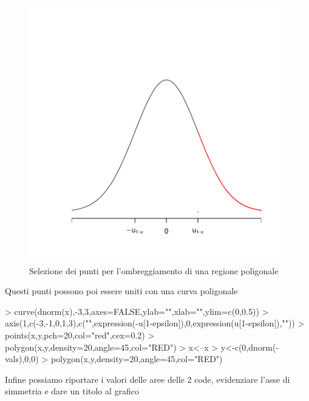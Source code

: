 \documentclass[onecolumn,11pt]{book}
\begin{document}
\begin{figure}\begin{center}
\includegraphics{statisticaconR-361}
\caption{ Selezione dei punti per l'ombreggiamento di una regione poligonale}
\label{normale200punti}
\end{center}
\end{figure}

Questi punti  possono poi essere uniti con una curva poligonale  
\begin{Schunk}
\begin{Sinput}
> curve(dnorm(x),-3,3,axes=FALSE,ylab="",xlab="",ylim=c(0,0.5))
> axis(1,c(-3,-1,0,1,3),c("",expression(-u[1-epsilon]),0,expression(u[1-epsilon]),""))
> points(x,y,pch=20,col="red",cex=0.2)
> polygon(x,y,density=20,angle=45,col="RED")
> x<--x
> y<-c(0,dnorm(-vals),0,0)
> polygon(x,y,density=20,angle=45,col="RED")
\end{Sinput}
\end{Schunk}

Infine possiamo riportare i valori delle aree delle 2 code, evidenziare l'asse di simmetria  e dare un titolo al grafico
\end{document}
